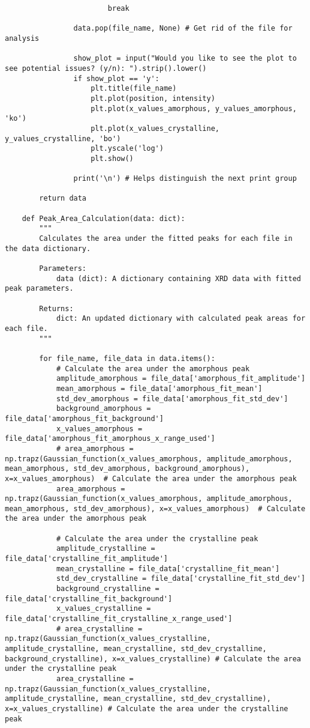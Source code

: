 \begin{lstlisting}
                        break

                data.pop(file_name, None) # Get rid of the file for analysis

                show_plot = input("Would you like to see the plot to see potential issues? (y/n): ").strip().lower()
                if show_plot == 'y':
                    plt.title(file_name)
                    plt.plot(position, intensity)
                    plt.plot(x_values_amorphous, y_values_amorphous, 'ko')
                    plt.plot(x_values_crystalline, y_values_crystalline, 'bo')
                    plt.yscale('log')
                    plt.show()

                print('\n') # Helps distinguish the next print group

        return data

    def Peak_Area_Calculation(data: dict):
        """
        Calculates the area under the fitted peaks for each file in the data dictionary.

        Parameters:
            data (dict): A dictionary containing XRD data with fitted peak parameters.

        Returns:
            dict: An updated dictionary with calculated peak areas for each file.
        """

        for file_name, file_data in data.items():
            # Calculate the area under the amorphous peak
            amplitude_amorphous = file_data['amorphous_fit_amplitude']
            mean_amorphous = file_data['amorphous_fit_mean']
            std_dev_amorphous = file_data['amorphous_fit_std_dev']
            background_amorphous = file_data['amorphous_fit_background']
            x_values_amorphous = file_data['amorphous_fit_amorphous_x_range_used']
            # area_amorphous = np.trapz(Gaussian_function(x_values_amorphous, amplitude_amorphous, mean_amorphous, std_dev_amorphous, background_amorphous), x=x_values_amorphous)  # Calculate the area under the amorphous peak
            area_amorphous = np.trapz(Gaussian_function(x_values_amorphous, amplitude_amorphous, mean_amorphous, std_dev_amorphous), x=x_values_amorphous)  # Calculate the area under the amorphous peak

            # Calculate the area under the crystalline peak
            amplitude_crystalline = file_data['crystalline_fit_amplitude']
            mean_crystalline = file_data['crystalline_fit_mean']
            std_dev_crystalline = file_data['crystalline_fit_std_dev']
            background_crystalline = file_data['crystalline_fit_background']
            x_values_crystalline = file_data['crystalline_fit_crystalline_x_range_used']
            # area_crystalline = np.trapz(Gaussian_function(x_values_crystalline, amplitude_crystalline, mean_crystalline, std_dev_crystalline, background_crystalline), x=x_values_crystalline) # Calculate the area under the crystalline peak
            area_crystalline = np.trapz(Gaussian_function(x_values_crystalline, amplitude_crystalline, mean_crystalline, std_dev_crystalline), x=x_values_crystalline) # Calculate the area under the crystalline peak


\end{lstlisting}
